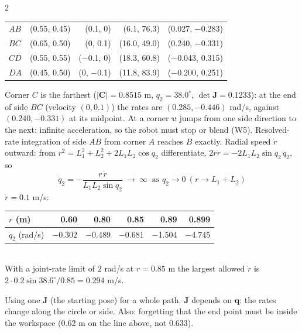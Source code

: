 \begin{multicols}{2}
\begin{center}
\begin{tabular}{@{}llrrr@{}}
$AB$&(0.55, 0.45)&(0.1, 0)&(6.1, 76.3)&(0.027, $-$0.283)\\
$BC$&(0.65, 0.50)&(0, 0.1)&(16.0, 49.0)&(0.240, $-$0.331)\\
$CD$&(0.55, 0.55)&($-$0.1, 0)&(18.3, 60.8)&($-$0.043, 0.315)\\
$DA$&(0.45, 0.50)&(0, $-$0.1)&(11.8, 83.9)&($-$0.200, 0.251)\\\bottomrule\end{tabular}
\end{center}
Corner $C$ is the farthest ($|\mathbf C|=0.8515$ m, $q_2=38.0^\circ$, $\det\mathbf J=0.1233$): at the end of side $BC$ (velocity $(0,0.1)$) the rates are $(0.285,-0.446)$ rad/s, against $(0.240,-0.331)$ at its midpoint. At a corner $\boldsymbol\upsilon$ jumps from one side direction to the next: infinite acceleration, so the robot must stop or blend (W5). Resolved-rate integration of side $AB$ from corner $A$ reaches $B$ exactly. \chk
{}
Radial speed $\dot r$ outward: from $r^2=L_1^2+L_2^2+2L_1L_2\cos q_2$ differentiate, $2r\dot r=-2L_1L_2\sin q_2\,\dot q_2$, so
\[\dot q_2=-\frac{r\,\dot r}{L_1L_2\sin q_2}\ \to\ \infty\ \text{ as }q_2\to0\ (r\to L_1+L_2)\]
$\dot r=0.1$ m/s: \quad\begin{tabular}{@{}lrrrrr@{}}\toprule $r$ (m)&0.60&0.80&0.85&0.89&0.899\\\midrule $\dot q_2$ (rad/s)&$-$0.302&$-$0.489&$-$0.681&$-$1.504&$-$4.745\\\bottomrule\end{tabular}\\
With a joint-rate limit of $2$ rad/s at $r=0.85$ m the largest allowed $\dot r$ is $2\cdot0.2\sin38.6^\circ/0.85=0.294$ m/s. \chk
\begin{trap}
Using one $\mathbf J$ (the starting pose) for a whole path. $\mathbf J$ depends on $\mathbf q$: the rates change along the circle or side. Also: forgetting that the end point must be inside the workspace ($0.62$ m on the line above, not $0.633$).
\end{trap}


\end{multicols}
